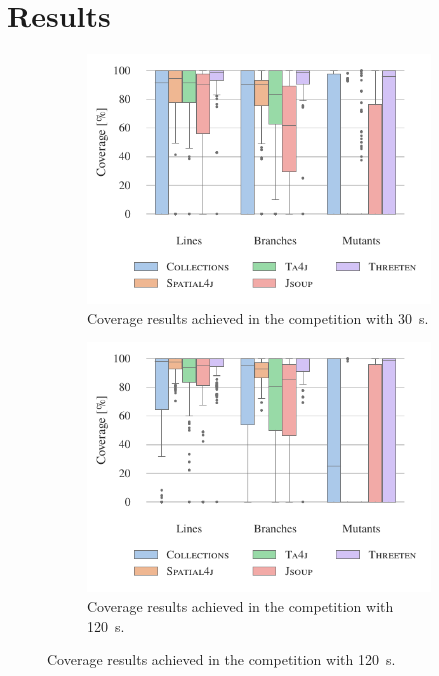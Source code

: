 \documentclass[10pt,conference]{IEEEtran}
\begin{document}
\section{Results}


\begin{figure}
  \centering

  \begin{subfigure}{\columnwidth}
    \includegraphics[width=\linewidth]{data/CoverageByBenchmark30.pdf}
    \caption{Coverage results achieved in the competition with \SI{30}{\second}.}
    \label{fig:results30}
  \end{subfigure}

  \begin{subfigure}{\columnwidth}
    \includegraphics[width=\linewidth]{data/CoverageByBenchmark120.pdf}
    \caption{Coverage results achieved in the competition with \SI{120}{\second}.}
    \label{fig:results120}
  \end{subfigure}


\end{figure}
\end{document}
